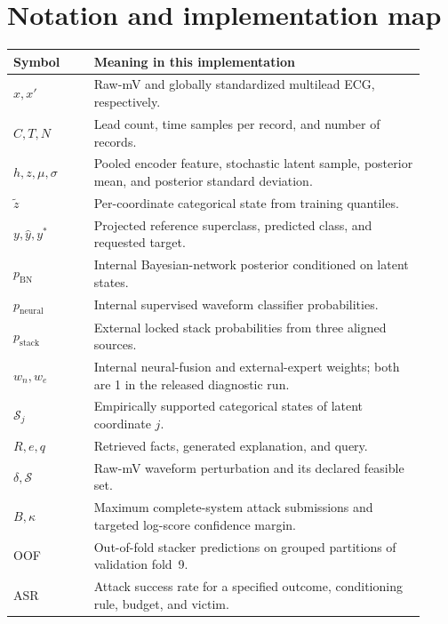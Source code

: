 \appendix
\section{Notation and implementation map}
\label{app:notation}
\begin{longtable}{p{0.18\linewidth}p{0.74\linewidth}}
\toprule Symbol & Meaning in this implementation\\\midrule\endhead
$x,x'$ & Raw-mV and globally standardized multilead ECG, respectively.\\
$C,T,N$ & Lead count, time samples per record, and number of records.\\
$h,z,\mu,\sigma$ & Pooled encoder feature, stochastic latent sample, posterior mean, and posterior standard deviation.\\
$\tilde z$ & Per-coordinate categorical state from training quantiles.\\
$y,\hat y,y^*$ & Projected reference superclass, predicted class, and requested target.\\
$p_{\mathrm{BN}}$ & Internal Bayesian-network posterior conditioned on latent states.\\
$p_{\mathrm{neural}}$ & Internal supervised waveform classifier probabilities.\\
$p_{\mathrm{stack}}$ & External locked stack probabilities from three aligned sources.\\
$w_n,w_e$ & Internal neural-fusion and external-expert weights; both are 1 in the released diagnostic run.\\
$\mathcal{S}_j$ & Empirically supported categorical states of latent coordinate $j$.\\
$R,e,q$ & Retrieved facts, generated explanation, and query.\\
$\delta,\mathcal{S}$ & Raw-mV waveform perturbation and its declared feasible set.\\
$B,\kappa$ & Maximum complete-system attack submissions and targeted log-score confidence margin.\\
OOF & Out-of-fold stacker predictions on grouped partitions of validation fold~9.\\
ASR & Attack success rate for a specified outcome, conditioning rule, budget, and victim.\\
\bottomrule
\end{longtable}

